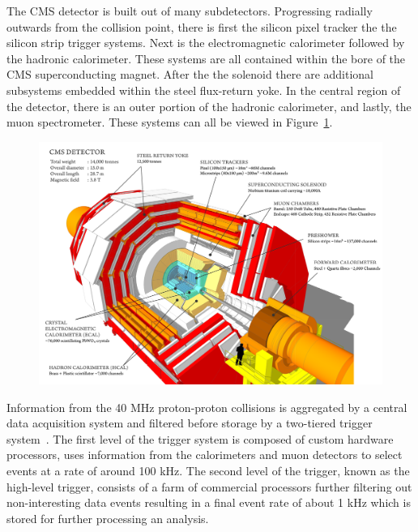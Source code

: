 The CMS detector is built out of many subdetectors. Progressing radially outwards from the collision point,
there is first the silicon pixel tracker the the silicon strip trigger systems. Next is the 
electromagnetic calorimeter followed by the hadronic calorimeter. These systems are all contained
within the bore of the CMS superconducting magnet. After the the solenoid there are additional subsystems
embedded within the steel flux-return yoke. In the central region of the detector, there is an 
outer portion of the hadronic calorimeter, and lastly, the muon spectrometer. These systems can all be viewed in
Figure~\ref{fig:cms_detector}.

\begin{figure}[htbp]
\centering
     \includegraphics[width=1.0\textwidth]{cms_and_lhc/plots/cms_detector.png}
     \caption{
     }
     \label{fig:cms_detector}
\end{figure}

Information from the 40 MHz proton-proton collisions is aggregated by a central data acquisition system
and filtered before storage by a two-tiered trigger system~\cite{Khachatryan:2016bia}. 
The first level of the trigger system is composed of custom hardware processors, uses information 
from the calorimeters and muon detectors to select events at a rate of around 100 kHz. The second level of
the trigger, known as the high-level trigger, consists of a farm of commercial processors further
filtering out non-interesting data events resulting in a final event rate of about 1 kHz which is stored
for further processing an analysis.



